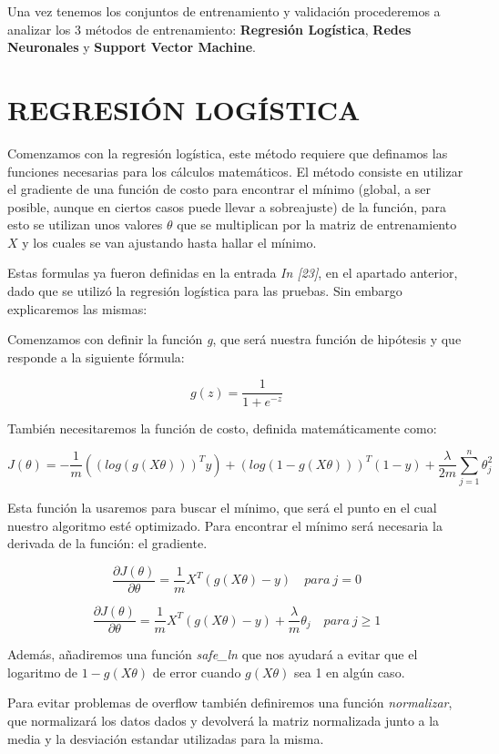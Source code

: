 \documentclass[11pt]{article}
\begin{document}
    Una vez tenemos los conjuntos de entrenamiento y validación procederemos
a analizar los 3 métodos de entrenamiento: \textbf{Regresión Logística},
\textbf{Redes Neuronales} y \textbf{Support Vector Machine}.

    \section{REGRESIÓN LOGÍSTICA}\label{regresiuxf3n-loguxedstica}

    Comenzamos con la regresión logística, este método requiere que
definamos las funciones necesarias para los cálculos matemáticos. El
método consiste en utilizar el gradiente de una función de costo para
encontrar el mínimo (global, a ser posible, aunque en ciertos casos
puede llevar a sobreajuste) de la función, para esto se utilizan unos
valores \(\theta\) que se multiplican por la matriz de entrenamiento
\(X\) y los cuales se van ajustando hasta hallar el mínimo.

Estas formulas ya fueron definidas en la entrada \emph{In {[}23{]}}, en
el apartado anterior, dado que se utilizó la regresión logística para
las pruebas. Sin embargo explicaremos las mismas:

Comenzamos con definir la función \emph{g}, que será nuestra función de
hipótesis y que responde a la siguiente fórmula:

\[g(z) = \frac{1}{1 + e^{-z}}\]

También necesitaremos la función de costo, definida matemáticamente
como:

\[J(\theta) = - \frac{1}{m}{( (log(g(X\theta) ))^{T}y) + (log(1 - g(X\theta)))^{T}(1-y)} + \frac{\lambda}{2m}\sum^n_{j=1}\theta^2_j\]

Esta función la usaremos para buscar el mínimo, que será el punto en el
cual nuestro algoritmo esté optimizado. Para encontrar el mínimo será
necesaria la derivada de la función: el gradiente.

\[\frac{\partial J(\theta)}{\partial \theta} = \frac{1}{m}{ X^{T} (g(X\theta) - y)} \quad  para\  j=0\]

\[\frac{\partial J(\theta)}{\partial \theta} = \frac{1}{m}{ X^{T} (g(X\theta) - y)} + \frac{\lambda}{m}\theta_j \quad  para\  j\ge1\]

Además, añadiremos una función \emph{safe\_ln} que nos ayudará a evitar
que el logaritmo de \(1-g(X\theta)\) de error cuando \(g(X\theta)\) sea
1 en algún caso.

Para evitar problemas de overflow también definiremos una función
\emph{normalizar}, que normalizará los datos dados y devolverá la matriz
normalizada junto a la media y la desviación estandar utilizadas para la
misma.
\end{document}
